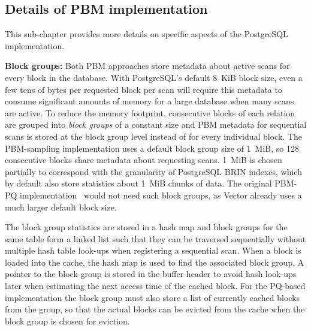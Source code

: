 \subsection{Details of PBM implementation}

This sub-chapter provides more details on specific aspects of the PostgreSQL implementation.


\textbf{Block groups:} Both PBM approaches store metadata about active scans for every block in the database. With PostgreSQL's default 8~KiB block size, even a few tens of bytes per requested block per scan will require this metadata to consume significant amounts of memory for a large database when many scans are active. To reduce the memory footprint, consecutive blocks of each relation are grouped into \textit{block groups} of a constant size and PBM metadata for sequential scans is stored at the block group level instead of for every individual block. The PBM-sampling implementation uses a default block group size of 1~MiB, so 128 consecutive blocks share metadata about requesting scans. 1~MiB is chosen partially to correspond with the granularity of PostgreSQL BRIN indexes, which by default also store statistics about 1~MiB chunks of data. The original PBM-PQ implementation~\cite{pbm} would not need such block groups, as Vector already uses a much larger default block size. \cite{vectorDocs}  %

The block group statistics are stored in a hash map and block groups for the same table form a linked list such that they can be traversed sequentially without multiple hash table look-ups when registering a sequential scan. %
When a block is loaded into the cache, the hash map is used to find the associated block group. A pointer to the block group is stored in the buffer header to avoid hash look-ups later when estimating the next access time of the cached block. For the PQ-based implementation the block group must also store a list of currently cached blocks from the group, so that the actual blocks can be evicted from the cache when the block group is chosen for eviction. 



